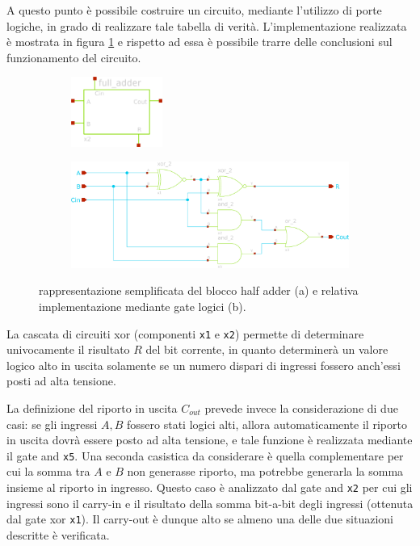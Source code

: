 	A questo punto è possibile costruire un circuito, mediante l'utilizzo di porte logiche, in grado di realizzare tale tabella di verità. L'implementazione realizzata è mostrata in figura \ref{fig:fa:sch} e rispetto ad essa è possibile trarre delle conclusioni sul funzionamento del circuito.
	
	\begin{figure}[bht]
		\centering
		\begin{subfigure}{0.48\linewidth}
			\centering
			\includegraphics[width=3cm]{Immagini/full-adder-sch}
			\caption{}
		\end{subfigure}
		\begin{subfigure}{0.48\linewidth}
			\centering
			\includegraphics[width=\linewidth]{Immagini/full-adder}
			\caption{}
		\end{subfigure}
		\caption{rappresentazione semplificata del blocco half adder (a) e relativa implementazione mediante gate logici (b).}
		\label{fig:fa:sch}
	\end{figure}
	
	La cascata di circuiti xor (componenti \texttt{x1} e \texttt{x2}) permette di determinare univocamente il risultato $R$ del bit corrente, in quanto determinerà un valore logico alto in uscita solamente se un numero dispari di ingressi fossero anch'essi posti ad alta tensione.
	
	La definizione del riporto in uscita $C_{out}$ prevede invece la considerazione di due casi: se gli ingressi $A,B$ fossero stati logici alti, allora automaticamente il riporto in uscita dovrà essere posto ad alta tensione, e tale funzione è realizzata mediante il gate and \texttt{x5}. Una seconda casistica da considerare è quella complementare per cui la somma tra $A$ e $B$ non generasse riporto, ma potrebbe generarla la somma insieme al riporto in ingresso. Questo caso è analizzato dal gate and \texttt{x2} per cui gli ingressi sono il carry-in e il risultato della somma bit-a-bit degli ingressi (ottenuta dal gate xor \texttt{x1}). Il carry-out è dunque alto se almeno una delle due situazioni descritte è verificata.
	
